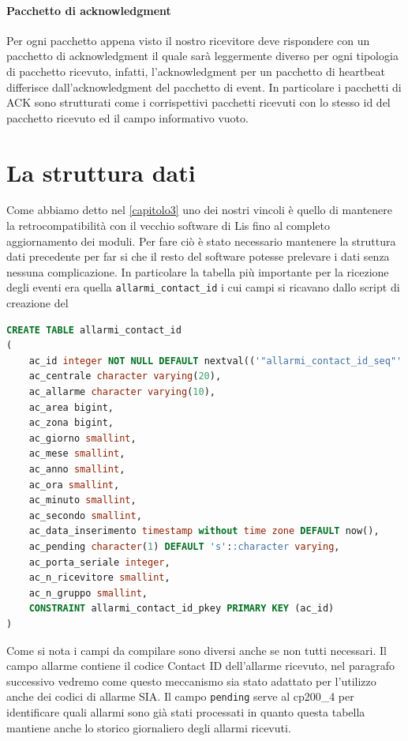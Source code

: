 \paragraph{Pacchetto di acknowledgment}
Per ogni pacchetto appena visto il nostro ricevitore deve rispondere con un pacchetto di acknowledgment il quale sarà leggermente diverso per ogni tipologia di pacchetto ricevuto, infatti, l'acknowledgment per un pacchetto di heartbeat differisce dall'acknowledgment del pacchetto di event. In particolare i pacchetti di ACK sono strutturati come i corrispettivi pacchetti ricevuti con lo stesso id del pacchetto ricevuto ed il campo informativo vuoto.
\section{La struttura dati}
Come abbiamo detto nel \chaptername \ref{capitolo3} uno dei nostri vincoli è quello di mantenere la retrocompatibilità con il vecchio software di Lis fino al completo aggiornamento dei moduli. Per fare ciò è stato necessario mantenere la struttura dati precedente per far si che il resto del software potesse prelevare i dati senza nessuna complicazione. In particolare la tabella più importante per la ricezione degli eventi era quella \texttt{allarmi\_contact\_id} i cui campi si ricavano dallo script di creazione del 
\begin{lstlisting}[language=SQL,caption=Tabella allarmi\_contact\_id,label=lst:allarmicontactid]
CREATE TABLE allarmi_contact_id
(
	ac_id integer NOT NULL DEFAULT nextval(('"allarmi_contact_id_seq"'::text)::regclass),
	ac_centrale character varying(20),
	ac_allarme character varying(10),
	ac_area bigint,
	ac_zona bigint,
	ac_giorno smallint,
	ac_mese smallint,
	ac_anno smallint,
	ac_ora smallint,
	ac_minuto smallint,
	ac_secondo smallint,
	ac_data_inserimento timestamp without time zone DEFAULT now(),
	ac_pending character(1) DEFAULT 's'::character varying,
	ac_porta_seriale integer,
	ac_n_ricevitore smallint,
	ac_n_gruppo smallint,
	CONSTRAINT allarmi_contact_id_pkey PRIMARY KEY (ac_id)
)
\end{lstlisting}
Come si nota i campi da compilare sono diversi anche se non tutti necessari. Il campo allarme contiene il codice Contact ID dell'allarme ricevuto, nel paragrafo successivo vedremo come questo meccanismo sia stato adattato per l'utilizzo anche dei codici di allarme SIA. Il campo \texttt{pending} serve al cp200\_4 per identificare quali allarmi sono già stati processati in quanto questa tabella mantiene anche lo storico giornaliero degli allarmi ricevuti.\\
